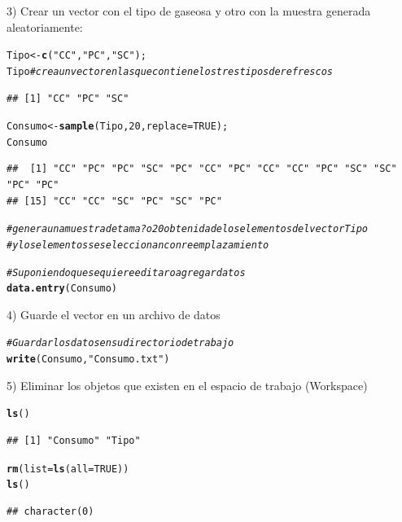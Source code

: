 \documentclass[12pt,letterpaper]{article}\usepackage[]{graphicx}\usepackage[]{color}
\makeatletter
\newcommand{\hlnum}[1]{\textcolor[rgb]{0.686,0.059,0.569}{#1}}%
\newcommand{\hlstr}[1]{\textcolor[rgb]{0.192,0.494,0.8}{#1}}%
\newcommand{\hlcom}[1]{\textcolor[rgb]{0.678,0.584,0.686}{\textit{#1}}}%
\newcommand{\hlstd}[1]{\textcolor[rgb]{0.345,0.345,0.345}{#1}}%
\newcommand{\hlkwb}[1]{\textcolor[rgb]{0.69,0.353,0.396}{#1}}%
\newcommand{\hlkwc}[1]{\textcolor[rgb]{0.333,0.667,0.333}{#1}}%
\newcommand{\hlkwd}[1]{\textcolor[rgb]{0.737,0.353,0.396}{\textbf{#1}}}%
\newenvironment{kframe}{%
 \def\at@end@of@kframe{}%
 \ifinner\ifhmode%
  \def\at@end@of@kframe{\end{minipage}}%
  \begin{minipage}{\columnwidth}%
 \fi\fi%
 \def\FrameCommand##1{\hskip\@totalleftmargin \hskip-\fboxsep
 \colorbox{shadecolor}{##1}\hskip-\fboxsep
     \hskip-\linewidth \hskip-\@totalleftmargin \hskip\columnwidth}%
 \MakeFramed {\advance\hsize-\width
   \@totalleftmargin\z@ \linewidth\hsize
   \@setminipage}}%
 {\par\unskip\endMakeFramed%
 \at@end@of@kframe}
\newenvironment{knitrout}{}{} %
\makeatother
\begin{document}
3) Crear un vector con el tipo de gaseosa y otro con la muestra generada aleatoriamente:
\begin{knitrout}
\color{fgcolor}\begin{kframe}
\begin{alltt}
\hlstd{Tipo} \hlkwb{<-} \hlkwd{c}\hlstd{(}\hlstr{"CC"}\hlstd{,} \hlstr{"PC"}\hlstd{,} \hlstr{"SC"}\hlstd{);}
\hlstd{Tipo} \hlcom{# crea un vector en las que contiene los tres tipos de refrescos}
\end{alltt}
\begin{verbatim}
## [1] "CC" "PC" "SC"
\end{verbatim}
\begin{alltt}
\hlstd{Consumo} \hlkwb{<-} \hlkwd{sample}\hlstd{(Tipo,} \hlnum{20}\hlstd{,} \hlkwc{replace}\hlstd{=}\hlnum{TRUE}\hlstd{);}
\hlstd{Consumo}
\end{alltt}
\begin{verbatim}
##  [1] "CC" "PC" "PC" "SC" "PC" "CC" "PC" "CC" "CC" "PC" "SC" "SC" "PC" "PC"
## [15] "CC" "CC" "SC" "PC" "SC" "PC"
\end{verbatim}
\begin{alltt}
\hlcom{# genera una muestra de tama?o 20 obtenida de los elementos del vector Tipo }
\hlcom{# y los elementos se seleccionan con reemplazamiento}

\hlcom{# Suponiendo que se quiere editar o agregar datos}
\hlkwd{data.entry}\hlstd{(Consumo)}
\end{alltt}
\end{kframe}
\end{knitrout}

4) Guarde el vector en un archivo de datos
\begin{knitrout}
\color{fgcolor}\begin{kframe}
\begin{alltt}
\hlcom{# Guardar los datos en su directorio de trabajo}
\hlkwd{write}\hlstd{(Consumo,} \hlstr{"Consumo.txt"}\hlstd{)}
\end{alltt}
\end{kframe}
\end{knitrout}

5) Eliminar los objetos que existen en el espacio de trabajo (Workspace)
\begin{knitrout}
\color{fgcolor}\begin{kframe}
\begin{alltt}
\hlkwd{ls}\hlstd{()}
\end{alltt}
\begin{verbatim}
## [1] "Consumo" "Tipo"
\end{verbatim}
\begin{alltt}
\hlkwd{rm}\hlstd{(}\hlkwc{list}\hlstd{=}\hlkwd{ls}\hlstd{(}\hlkwc{all}\hlstd{=}\hlnum{TRUE}\hlstd{))}
\hlkwd{ls}\hlstd{()}
\end{alltt}
\begin{verbatim}
## character(0)
\end{verbatim}
\end{kframe}
\end{knitrout}
\end{document}
